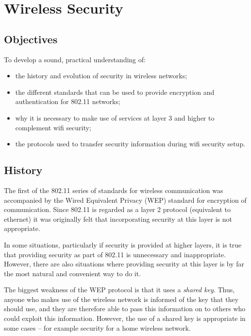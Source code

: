 \chapter{Wireless Security}\label{security}

\minitoc 

\clearpage
\section*{Objectives}
To develop a sound, practical understanding of:
\begin{itemize}

\item the history and evolution of security in wireless networks;

\item the different standards that can be used to provide encryption and authentication for 802.11 networks;

\item why it is necessary to make use of services at layer 3 and higher to complement wifi security;

\item the protocols used to transfer security information during wifi security setup.

\end{itemize}


\section{History}
The first of the 802.11 series of standards for wireless communication was accompanied
by the Wired Equivalent Privacy (WEP) standard for encryption of communication. Since
802.11 is regarded as a layer 2 protocol (equivalent to ethernet) it was originally felt that
incorporating security at this layer is not appropriate.

In some situations, particularly if security is provided at higher layers, it is true that providing
security as part of 802.11 is unnecessary and inappropriate. However, there are also situations
where providing security at this layer is by far the most natural and convenient way to do it.

The biggest weakness of the WEP protocol is that it uses a {\em shared key}. Thus, anyone who
makes use of the wireless network is informed of the key that they should use, and they
are therefore able to pass this information on to others who could exploit this information.
However, the use of a shared key is appropriate in some cases – for example security for a
home wireless network.

